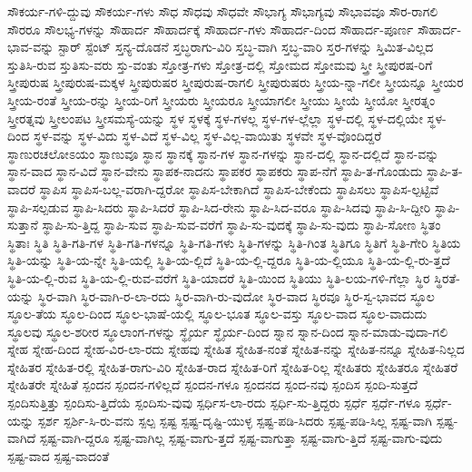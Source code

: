 {ಸೌಕರ್ಯ-ಗಳಿ-ದ್ದುವು
ಸೌಕರ್ಯ-ಗಳು
ಸೌಧ
ಸೌಧವು
ಸೌಧವೇ
ಸೌಭಾಗ್ಯ
ಸೌಭಾಗ್ಯವು
ಸೌಭಾವವೂ
ಸೌರ-ರಾಗಲಿ
ಸೌರರೂ
ಸೌಲಭ್ಯ-ಗಳನ್ನು
ಸೌಹಾರ್ದ
ಸೌಹಾರ್ದಕ್ಕೆ
ಸೌಹಾರ್ದ-ಗಳು
ಸೌಹಾರ್ದ-ದಿಂದ
ಸೌಹಾರ್ದ-ಪೂರ್ಣ
ಸೌಹಾರ್ದ-ಭಾವ-ವನ್ನು
ಸ್ಟಾರ್
ಸ್ಟೆಂಟ್
ಸ್ತನ್ಯ-ದೊಡನೆ
ಸ್ತಬ್ಧರಾಗು-ವಿರಿ
ಸ್ತಬ್ಧ-ವಾಗಿ
ಸ್ತಬ್ಧ-ವಾರಿ
ಸ್ತರ-ಗಳನ್ನು
ಸ್ತಿಮಿತ-ವಿಲ್ಲದ
ಸ್ತುತಿಸಿ-ರುವ
ಸ್ತುತಿಸು-ವರು
ಸ್ತು-ವಂತು
ಸ್ತೋತ್ರ-ಗಳು
ಸ್ತೋತ್ರ-ದಲ್ಲಿ
ಸ್ತೋಮದ
ಸ್ತೋಮವು
ಸ್ತ್ರೀ
ಸ್ತ್ರೀಪುರಷ-ರಿಗೆ
ಸ್ತ್ರೀಪುರುಷ
ಸ್ತ್ರೀಪುರುಷ-ಮಕ್ಕಳ
ಸ್ತ್ರೀಪುರುಷರ
ಸ್ತ್ರೀಪುರುಷ-ರಾಗಲಿ
ಸ್ತ್ರೀಪುರುಷರು
ಸ್ತ್ರೀಯ-ನ್ನಾ-ಗಲೀ
ಸ್ತ್ರೀಯನ್ನೂ
ಸ್ತ್ರೀಯರ
ಸ್ತ್ರೀಯ-ರಂತೆ
ಸ್ತ್ರೀಯ-ರನ್ನು
ಸ್ತ್ರೀಯ-ರಿಗೆ
ಸ್ತ್ರೀಯರು
ಸ್ತ್ರೀಯರೂ
ಸ್ತ್ರೀಯಾಗಲೀ
ಸ್ತ್ರೀಯು
ಸ್ತ್ರೀಯೆ
ಸ್ತ್ರೀಯೋ
ಸ್ತ್ರೀರತ್ನಂ
ಸ್ತ್ರೀರತ್ನವು
ಸ್ತ್ರೀಲಂಪಟ
ಸ್ತ್ರೀಸಮಸ್ಯೆ-ಯನ್ನು
ಸ್ಥಳ
ಸ್ಥಳಕ್ಕೆ
ಸ್ಥಳ-ಗಳಲ್ಲ
ಸ್ಥಳ-ಗಳ-ಲ್ಲೆಲ್ಲಾ
ಸ್ಥಳ-ದಲ್ಲಿ
ಸ್ಥಳ-ದಲ್ಲಿಯೇ
ಸ್ಥಳ-ದಿಂದ
ಸ್ಥಳ-ವನ್ನು
ಸ್ಥಳ-ವಿದು
ಸ್ಥಳ-ವಿದೆ
ಸ್ಥಳ-ವಿಲ್ಲ
ಸ್ಥಳ-ವಿಲ್ಲ-ವಾಯಿತು
ಸ್ಥಳವೇ
ಸ್ಥಳ-ವೊಂದಿದ್ದರೆ
ಸ್ಥಾಣುರಚಲೋಽಯಂ
ಸ್ಥಾಣುವೂ
ಸ್ಥಾನ
ಸ್ಥಾನಕ್ಕೆ
ಸ್ಥಾನ-ಗಳ
ಸ್ಥಾನ-ಗಳನ್ನು
ಸ್ಥಾನ-ದಲ್ಲಿ
ಸ್ಥಾನ-ದಲ್ಲಿದೆ
ಸ್ಥಾನ-ವನ್ನು
ಸ್ಥಾನ-ವಾದ
ಸ್ಥಾನ-ವಿದೆ
ಸ್ಥಾನ-ವೇನು
ಸ್ಥಾಪಕ-ನಾದನು
ಸ್ಥಾಪಕರ
ಸ್ಥಾಪಕರು
ಸ್ಥಾಪ-ನೆಗೆ
ಸ್ಥಾಪಿ-ತ-ಗೊಂಡುದು
ಸ್ಥಾಪಿ-ತ-ವಾದರೆ
ಸ್ಥಾಪಿಸ
ಸ್ಥಾಪಿಸ-ಬಲ್ಲ-ವರಾಗಿ-ದ್ದರೋ
ಸ್ಥಾಪಿಸ-ಬೇಕಾಗಿದೆ
ಸ್ಥಾಪಿಸ-ಬೇಕೆಂದು
ಸ್ಥಾಪಿಸಲು
ಸ್ಥಾಪಿಸ-ಲ್ಪಟ್ಟಿವೆ
ಸ್ಥಾಪಿ-ಸಲ್ಪಡುವ
ಸ್ಥಾಪಿ-ಸಿದರು
ಸ್ಥಾಪಿ-ಸಿದರೆ
ಸ್ಥಾಪಿ-ಸಿದ-ರೇನು
ಸ್ಥಾಪಿ-ಸಿದ-ವರೂ
ಸ್ಥಾಪಿ-ಸಿದವು
ಸ್ಥಾಪಿ-ಸಿ-ದ್ದೀರಿ
ಸ್ಥಾಪಿ-ಸುತ್ತಾನೆ
ಸ್ಥಾಪಿ-ಸು-ತ್ತಿದ್ದ
ಸ್ಥಾಪಿ-ಸುವ
ಸ್ಥಾಪಿ-ಸುವ-ವರೆಗೆ
ಸ್ಥಾಪಿ-ಸು-ವುದಕ್ಕೆ
ಸ್ಥಾಪಿ-ಸು-ವುದು
ಸ್ಥಾಪಿ-ಸೋಣ
ಸ್ಥಿತಂ
ಸ್ಥಿತಾಃ
ಸ್ಥಿತಿ
ಸ್ಥಿತಿ-ಗತಿ-ಗಳ
ಸ್ಥಿತಿ-ಗತಿ-ಗಳನ್ನೂ
ಸ್ಥಿತಿ-ಗತಿ-ಗಳು
ಸ್ಥಿತಿ-ಗಳನ್ನು
ಸ್ಥಿತಿ-ಗಿಂತ
ಸ್ಥಿತಿಗೂ
ಸ್ಥಿತಿಗೆ
ಸ್ಥಿತಿ-ಗೇರಿ
ಸ್ಥಿತಿಯ
ಸ್ಥಿತಿ-ಯನ್ನು
ಸ್ಥಿತಿ-ಯ-ನ್ನೇ
ಸ್ಥಿತಿ-ಯಲ್ಲಿ
ಸ್ಥಿತಿ-ಯ-ಲ್ಲಿದೆ
ಸ್ಥಿತಿ-ಯ-ಲ್ಲಿ-ದ್ದರೂ
ಸ್ಥಿತಿ-ಯ-ಲ್ಲಿಯೂ
ಸ್ಥಿತಿ-ಯ-ಲ್ಲಿ-ರು-ತ್ತದೆ
ಸ್ಥಿತಿ-ಯ-ಲ್ಲಿ-ರುವ
ಸ್ಥಿತಿ-ಯ-ಲ್ಲಿ-ರುವ-ವರೆಗೆ
ಸ್ಥಿತಿ-ಯಾದರೆ
ಸ್ಥಿತಿ-ಯಿಂದ
ಸ್ಥಿತಿಯು
ಸ್ಥಿತಿ-ಲಯ-ಗಳಿ-ಗೆಲ್ಲಾ
ಸ್ಥಿರ
ಸ್ಥಿರತೆ-ಯನ್ನು
ಸ್ಥಿರ-ವಾಗಿ
ಸ್ಥಿರ-ವಾಗಿ-ರ-ಲಾ-ರದು
ಸ್ಥಿರ-ವಾಗಿ-ರು-ವುದೋ
ಸ್ಥಿರ-ವಾದ
ಸ್ಥಿರವೂ
ಸ್ಥಿರ-ಸ್ವ-ಭಾವದ
ಸ್ಥೂಲ
ಸ್ಥೂಲ-ತೆಯ
ಸ್ಥೂಲ-ದಿಂದ
ಸ್ಥೂಲ-ಭಾಷೆ-ಯಲ್ಲಿ
ಸ್ಥೂಲ-ಭೂತ
ಸ್ಥೂಲ-ವಸ್ತು
ಸ್ಥೂಲ-ವಾದ
ಸ್ಥೂಲ-ವಾದುದು
ಸ್ಥೂಲವು
ಸ್ಥೂಲ-ಶರೀರ
ಸ್ಥೂಲಾಂಗ-ಗಳನ್ನು
ಸ್ಥೈರ್ಯ
ಸ್ಥೈರ್ಯ-ದಿಂದ
ಸ್ನಾನ
ಸ್ನಾನ-ದಿಂದ
ಸ್ನಾನ-ಮಾಡು-ವುದಾ-ಗಲಿ
ಸ್ನೇಹ
ಸ್ನೇಹ-ದಿಂದ
ಸ್ನೇಹ-ವಿರ-ಲಾ-ರದು
ಸ್ನೇಹವು
ಸ್ನೇಹಿತ
ಸ್ನೇಹಿತ-ನಂತೆ
ಸ್ನೇಹಿತ-ನನ್ನು
ಸ್ನೇಹಿತ-ನನ್ನೂ
ಸ್ನೇಹಿತ-ನಿಲ್ಲದ
ಸ್ನೇಹಿತರ
ಸ್ನೇಹಿತ-ರಲ್ಲಿ
ಸ್ನೇಹಿತ-ರಾಗು-ವಿರಿ
ಸ್ನೇಹಿತ-ರಾದ
ಸ್ನೇಹಿತ-ರಿಗೆ
ಸ್ನೇಹಿತ-ರಿಲ್ಲ
ಸ್ನೇಹಿತರು
ಸ್ನೇಹಿತರೂ
ಸ್ನೇಹಿತರೆ
ಸ್ನೇಹಿತರೇ
ಸ್ನೇಹಿತೆ
ಸ್ಪಂದನ
ಸ್ಪಂದನ-ಗಳಿಲ್ಲದೆ
ಸ್ಪಂದನ-ಗಳೂ
ಸ್ಪಂದನದ
ಸ್ಪಂದ-ನವು
ಸ್ಪಂದಿಸ
ಸ್ಪಂದಿ-ಸುತ್ತದೆ
ಸ್ಪಂದಿಸುತ್ತಿತ್ತು
ಸ್ಪಂದಿಸು-ತ್ತಿದೆಯೆ
ಸ್ಪಂದಿಸು-ವುವು
ಸ್ಪರ್ಧಿಸ-ಲಾ-ರದು
ಸ್ಪರ್ಧಿ-ಸು-ತ್ತಿದ್ದರು
ಸ್ಪರ್ಧೆ
ಸ್ಪರ್ಧೆ-ಗಳೂ
ಸ್ಪರ್ಧೆ-ಯನ್ನು
ಸ್ಪರ್ಶ
ಸ್ಪರ್ಶಿ-ಸಿ-ರು-ವನು
ಸ್ಪಲ್ಪ
ಸ್ಪಷ್ಟ
ಸ್ಪಷ್ಟ-ದೃಷ್ಟಿ-ಯುಳ್ಳ
ಸ್ಪಷ್ಟ-ಪಡಿ-ಸಿದರು
ಸ್ಪಷ್ಟ-ಪಡಿ-ಸಿಲ್ಲ
ಸ್ಪಷ್ಟ-ವಾಗಿ
ಸ್ಪಷ್ಟ-ವಾಗಿದೆ
ಸ್ಪಷ್ಟ-ವಾಗಿ-ದ್ದರೂ
ಸ್ಪಷ್ಟ-ವಾಗಿಲ್ಲ
ಸ್ಪಷ್ಟ-ವಾಗು-ತ್ತದೆ
ಸ್ಪಷ್ಟ-ವಾಗುತ್ತಾ
ಸ್ಪಷ್ಟ-ವಾಗು-ತ್ತಿದೆ
ಸ್ಪಷ್ಟ-ವಾಗು-ವುದು
ಸ್ಪಷ್ಟ-ವಾದ
ಸ್ಪಷ್ಟ-ವಾದಂತೆ
}

